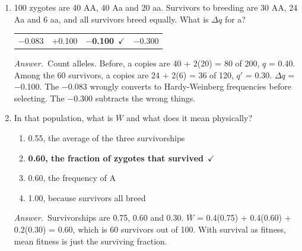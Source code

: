 \documentclass[11pt]{article}
\newcommand{\keyans}[1]{\par\medskip\noindent\textit{Answer.}\ #1\par\medskip}
\begin{document}
\vspace{0.6em}
\begin{enumerate}[label=\textbf{\arabic*.}, leftmargin=2em, itemsep=1.4em]
\item 100 zygotes are 40 AA, 40 Aa and 20 aa. Survivors to breeding are 30 AA, 24 Aa and 6 aa, and all survivors breed equally. What is \(\Delta q\) for a?
\nopagebreak\par{}
\par\smallskip\noindent\begin{tabularx}{\linewidth}{@{}YYYY@{}}
\(-\)0.083 & +0.100 & \textbf{\(-\)0.100}\ \(\checkmark\) & \(-\)0.300 \\
\end{tabularx}
\keyans{Count alleles. Before, a copies are 40 + 2(20) = 80 of 200, \(q\) = 0.40. Among the 60 survivors, a copies are 24 + 2(6) = 36 of 120, \(q'\) = 0.30. \(\Delta q\) = \(-\)0.100. The \(-\)0.083 wrongly converts to Hardy-Weinberg frequencies before selecting. The \(-\)0.300 subtracts the wrong things.}
\item In that population, what is \(\overline{W}\) and what does it mean physically?
\nopagebreak\par{}
\par\smallskip
\begin{enumerate}[label={}, leftmargin=2.4em, labelwidth=0pt, itemsep=2pt, topsep=0pt]
\item \hspace*{-2.4em}0.55, the average of the three survivorships
\item \hspace*{-2.4em}\textbf{0.60, the fraction of zygotes that survived}\ \(\checkmark\)
\item \hspace*{-2.4em}0.60, the frequency of A
\item \hspace*{-2.4em}1.00, because survivors all breed
\end{enumerate}
\keyans{Survivorships are 0.75, 0.60 and 0.30. \(\overline{W}\) = 0.4(0.75) + 0.4(0.60) + 0.2(0.30) = 0.60, which is 60 survivors out of 100. With survival as fitness, mean fitness is just the surviving fraction.}

\end{enumerate}
\end{document}

